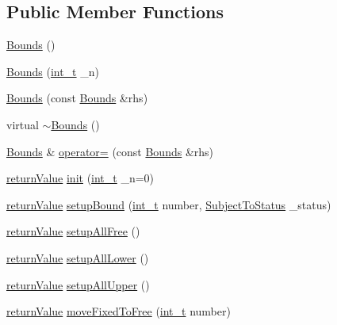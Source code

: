 \subsection*{Public Member Functions}
\begin{DoxyCompactItemize}
\item 
\hyperlink{class_bounds_a4df99b6aeade42ade4eaf2d1a14e176a}{Bounds} ()
\item 
\hyperlink{class_bounds_abe2a9220884f74cbe7496075ff6baacb}{Bounds} (\hyperlink{_types_8hpp_ab6fd6105e64ed14a0c9281326f05e623}{int\+\_\+t} \+\_\+n)
\item 
\hyperlink{class_bounds_acc45b5ad09d22f0aa1f2594bf426f700}{Bounds} (const \hyperlink{class_bounds}{Bounds} \&rhs)
\item 
virtual \hyperlink{class_bounds_aed8643720e1ca9c1da0b902aec80d3c4}{$\sim$\+Bounds} ()
\item 
\hyperlink{class_bounds}{Bounds} \& \hyperlink{class_bounds_a394c33cd33ba7c8560121f414bececdb}{operator=} (const \hyperlink{class_bounds}{Bounds} \&rhs)
\item 
\hyperlink{_message_handling_8hpp_a81d556f613bfbabd0b1f9488c0fa865e}{return\+Value} \hyperlink{class_bounds_a1ae1d7d6e084ce84420ad5086b7af4ab}{init} (\hyperlink{_types_8hpp_ab6fd6105e64ed14a0c9281326f05e623}{int\+\_\+t} \+\_\+n=0)
\item 
\hyperlink{_message_handling_8hpp_a81d556f613bfbabd0b1f9488c0fa865e}{return\+Value} \hyperlink{class_bounds_ae7d4a71da1bfcb331f920d1a1695d001}{setup\+Bound} (\hyperlink{_types_8hpp_ab6fd6105e64ed14a0c9281326f05e623}{int\+\_\+t} number, \hyperlink{_types_8hpp_a70a6a40d261a015ead8d43aa589383a4}{Subject\+To\+Status} \+\_\+status)
\item 
\hyperlink{_message_handling_8hpp_a81d556f613bfbabd0b1f9488c0fa865e}{return\+Value} \hyperlink{class_bounds_ae2f0eb4f34eb9a16b7d036ce23fa7ad0}{setup\+All\+Free} ()
\item 
\hyperlink{_message_handling_8hpp_a81d556f613bfbabd0b1f9488c0fa865e}{return\+Value} \hyperlink{class_bounds_a3e87cf95718653034b86d021f70e45ac}{setup\+All\+Lower} ()
\item 
\hyperlink{_message_handling_8hpp_a81d556f613bfbabd0b1f9488c0fa865e}{return\+Value} \hyperlink{class_bounds_a0626b894a71f058d3eebf3ee37f6f8d2}{setup\+All\+Upper} ()
\item 
\hyperlink{_message_handling_8hpp_a81d556f613bfbabd0b1f9488c0fa865e}{return\+Value} \hyperlink{class_bounds_a3ba36cd0625c609e01547f6412e52419}{move\+Fixed\+To\+Free} (\hyperlink{_types_8hpp_ab6fd6105e64ed14a0c9281326f05e623}{int\+\_\+t} number)

\end{DoxyCompactItemize}

